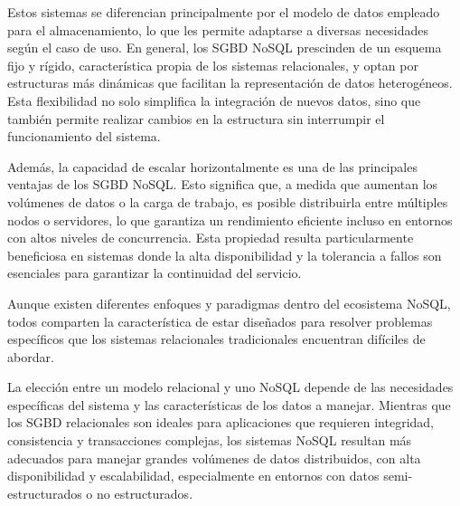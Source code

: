 Estos sistemas se diferencian principalmente por el modelo de datos empleado para el almacenamiento, 
lo que les permite adaptarse a diversas necesidades según el caso de uso. En general, los SGBD NoSQL 
prescinden de un esquema fijo y rígido, característica propia de los sistemas relacionales, y optan 
por estructuras más dinámicas que facilitan la representación de datos heterogéneos. Esta 
flexibilidad no solo simplifica la integración de nuevos datos, sino que también permite realizar 
cambios en la estructura sin interrumpir el funcionamiento del sistema.

Además, la capacidad de escalar horizontalmente es una de las principales ventajas de los SGBD NoSQL. 
Esto significa que, a medida que aumentan los volúmenes de datos o la carga de trabajo, es posible 
distribuirla entre múltiples nodos o servidores, lo que garantiza un rendimiento eficiente incluso 
en entornos con altos niveles de concurrencia. Esta propiedad resulta particularmente beneficiosa 
en sistemas donde la alta disponibilidad y la tolerancia a fallos son esenciales para garantizar la 
continuidad del servicio. 

Aunque existen diferentes enfoques y paradigmas dentro del ecosistema NoSQL, 
todos comparten la característica de estar diseñados para resolver problemas específicos que los 
sistemas relacionales tradicionales encuentran difíciles de abordar.

La elección entre un modelo relacional y uno NoSQL depende de las necesidades específicas 
del sistema y las características de los datos a manejar. Mientras que los SGBD 
relacionales son ideales para aplicaciones que requieren integridad, consistencia y 
transacciones complejas, los sistemas NoSQL resultan más adecuados para manejar 
grandes volúmenes de datos distribuidos, con alta disponibilidad y escalabilidad, 
especialmente en entornos con datos semi-estructurados o no estructurados.
